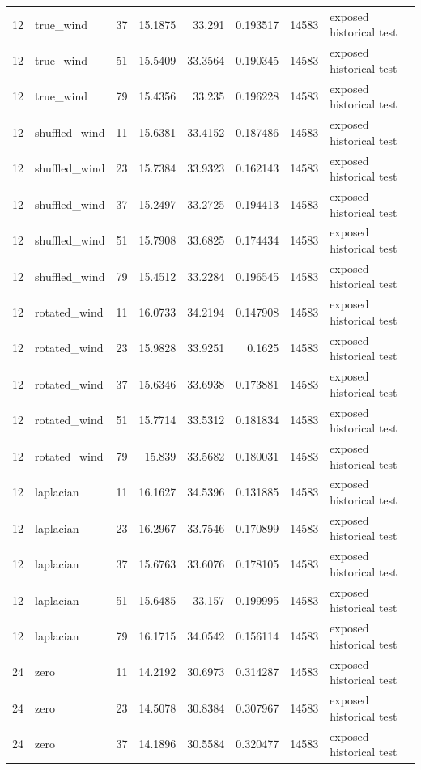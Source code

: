 \begin{tabular}{rllrrrrl}
12 & true\_wind & 37 & 15.1875 & 33.291 & 0.193517 & 14583 & exposed historical test \\
12 & true\_wind & 51 & 15.5409 & 33.3564 & 0.190345 & 14583 & exposed historical test \\
12 & true\_wind & 79 & 15.4356 & 33.235 & 0.196228 & 14583 & exposed historical test \\
12 & shuffled\_wind & 11 & 15.6381 & 33.4152 & 0.187486 & 14583 & exposed historical test \\
12 & shuffled\_wind & 23 & 15.7384 & 33.9323 & 0.162143 & 14583 & exposed historical test \\
12 & shuffled\_wind & 37 & 15.2497 & 33.2725 & 0.194413 & 14583 & exposed historical test \\
12 & shuffled\_wind & 51 & 15.7908 & 33.6825 & 0.174434 & 14583 & exposed historical test \\
12 & shuffled\_wind & 79 & 15.4512 & 33.2284 & 0.196545 & 14583 & exposed historical test \\
12 & rotated\_wind & 11 & 16.0733 & 34.2194 & 0.147908 & 14583 & exposed historical test \\
12 & rotated\_wind & 23 & 15.9828 & 33.9251 & 0.1625 & 14583 & exposed historical test \\
12 & rotated\_wind & 37 & 15.6346 & 33.6938 & 0.173881 & 14583 & exposed historical test \\
12 & rotated\_wind & 51 & 15.7714 & 33.5312 & 0.181834 & 14583 & exposed historical test \\
12 & rotated\_wind & 79 & 15.839 & 33.5682 & 0.180031 & 14583 & exposed historical test \\
12 & laplacian & 11 & 16.1627 & 34.5396 & 0.131885 & 14583 & exposed historical test \\
12 & laplacian & 23 & 16.2967 & 33.7546 & 0.170899 & 14583 & exposed historical test \\
12 & laplacian & 37 & 15.6763 & 33.6076 & 0.178105 & 14583 & exposed historical test \\
12 & laplacian & 51 & 15.6485 & 33.157 & 0.199995 & 14583 & exposed historical test \\
12 & laplacian & 79 & 16.1715 & 34.0542 & 0.156114 & 14583 & exposed historical test \\
24 & zero & 11 & 14.2192 & 30.6973 & 0.314287 & 14583 & exposed historical test \\
24 & zero & 23 & 14.5078 & 30.8384 & 0.307967 & 14583 & exposed historical test \\
24 & zero & 37 & 14.1896 & 30.5584 & 0.320477 & 14583 & exposed historical test \\

\end{tabular}
